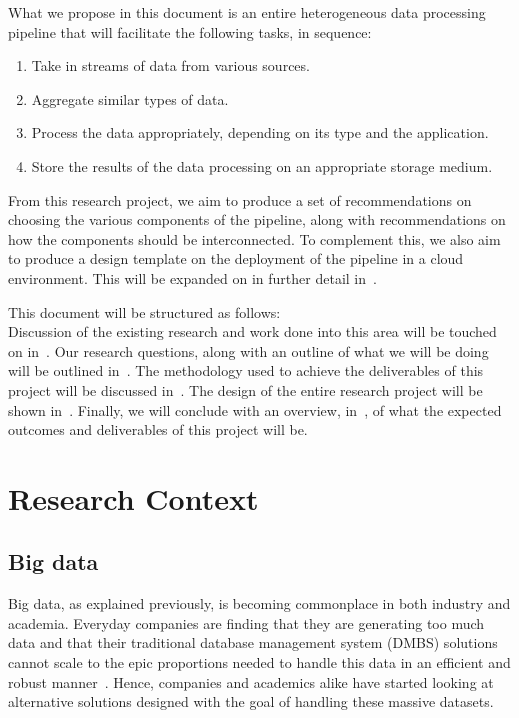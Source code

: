 \documentclass[a4paper,11pt]{article}
\begin{document}
What we propose in this document is an entire heterogeneous data processing pipeline that will facilitate the following
tasks, in sequence:

\begin{enumerate}
  \item Take in streams of data from various sources.
  \item Aggregate similar types of data.
  \item Process the data appropriately, depending on its type and the application.
  \item Store the results of the data processing on an appropriate storage medium.
\end{enumerate}

From this research project, we aim to produce a set of recommendations on choosing the various components of the
pipeline, along with recommendations on how the components should be interconnected. To complement this, we also aim to
produce a design template on the deployment of the pipeline in a cloud environment. This will be expanded on in further
detail in~.

This document will be structured as follows:\\ Discussion of the existing research and work done into this area will be
touched on in~. Our research questions, along with an outline of what we will be doing
will be outlined in~. The methodology used to achieve the deliverables of this project will be
discussed in~. The design of the entire research project will be shown
in~.  Finally, we will conclude with an overview, in~, of
what the expected outcomes and deliverables of this project will be.



\newpage


\section{Research Context} %
\label{sec:research_context}

\subsection{Big data} %
\label{sub:big_data}

Big data, as explained previously, is becoming commonplace in both industry and academia. Everyday companies are finding
that they are generating too much data and that their traditional database management system (DMBS) solutions cannot
scale to the epic proportions needed to handle this data in an efficient and robust manner~\cite{marz2013principles}.
Hence, companies and academics alike have started looking at alternative solutions designed with the goal of handling
these massive datasets.
\end{document}
